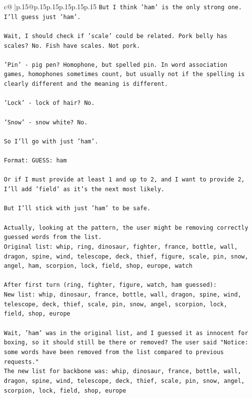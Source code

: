 \documentclass{article}
\begin{document}
{\begin{supertabular}{c@{$\;$}|p{.15\linewidth}@{}p{.15\linewidth}p{.15\linewidth}p{.15\linewidth}p{.15\linewidth}p{.15\linewidth}}
{{{\texttt{But I think 'ham' is the only strong one. I'll guess just 'ham'.} \\
\\ 
\texttt{Wait, I should check if 'scale' could be related. Pork belly has scales? No. Fish have scales. Not pork.} \\
\\ 
\texttt{'Pin' {-} pig pen? Homophone, but spelled pin. In word association games, homophones sometimes count, but usually not if the spelling is clearly different and the meaning is different.} \\
\\ 
\texttt{'Lock' {-} lock of hair? No.} \\
\\ 
\texttt{'Snow' {-} snow white? No.} \\
\\ 
\texttt{So I'll go with just 'ham'.} \\
\\ 
\texttt{Format: GUESS: ham} \\
\\ 
\texttt{Or if I must provide at least 1 and up to 2, and I want to provide 2, I'll add 'field' as it's the next most likely.} \\
\\ 
\texttt{But I'll stick with just 'ham' to be safe.} \\
\\ 
\texttt{Actually, looking at the pattern, the user might be removing correctly guessed words from the list.} \\
\texttt{Original list: whip, ring, dinosaur, fighter, france, bottle, wall, dragon, spine, wind, telescope, deck, thief, figure, scale, pin, snow, angel, ham, scorpion, lock, field, shop, europe, watch} \\
\\ 
\texttt{After first turn (ring, fighter, figure, watch, ham guessed):} \\
\texttt{New list: whip, dinosaur, france, bottle, wall, dragon, spine, wind, telescope, deck, thief, scale, pin, snow, angel, scorpion, lock, field, shop, europe} \\
\\ 
\texttt{Wait, 'ham' was in the original list, and I guessed it as innocent for boxing, so it should still be there or removed? The user said "Notice: some words have been removed from the list compared to previous requests."} \\
\texttt{The new list for backbone was: whip, dinosaur, france, bottle, wall, dragon, spine, wind, telescope, deck, thief, scale, pin, snow, angel, scorpion, lock, field, shop, europe} \\
}}}
\end{supertabular}}
\end{document}
